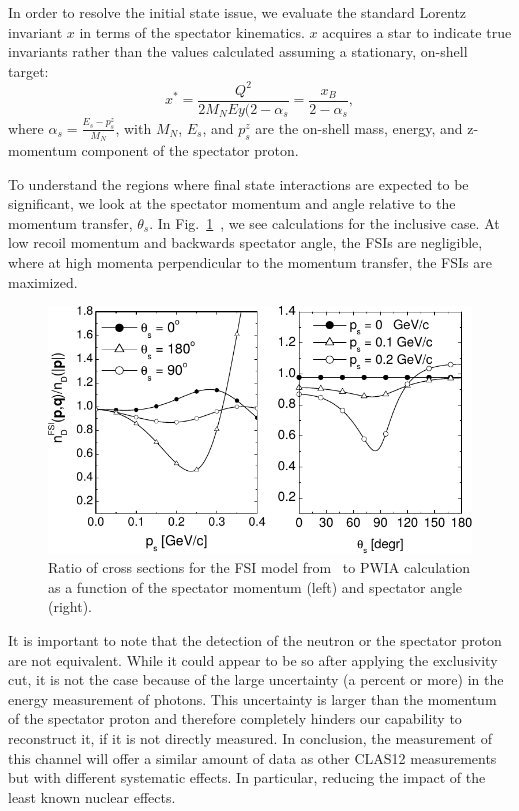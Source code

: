 In order to resolve the initial state issue, we evaluate the standard Lorentz invariant 
$x$ in terms of the spectator kinematics. $x$ acquires a star to indicate  true 
invariants rather than the values calculated assuming a stationary, on-shell 
target:
\begin{equation}
   x^* = \frac{Q^2}{2M_{N}Ey (2-\alpha_s} = \frac{x_B}{2-\alpha_s},
\end{equation} 
where $\alpha_s = \frac{E_s - p^{z}_{s}}{M_N}$, with $M_N$, $E_s$, and 
$p^{z}_{s}$ are the on-shell mass, energy, and z-momentum component of the 
spectator proton. 

To understand the regions where final state interactions are expected to be significant, we
look at the spectator momentum 
and angle relative to the momentum transfer, $\theta_s$. In 
Fig.~\ref{fig:deuteronFSI}~\cite{CiofidegliAtti:2003pb,CiofidegliAtti:2002as}, we
see calculations for the inclusive case.  
At low recoil momentum and backwards spectator angle, the FSIs are negligible, 
where at high momenta perpendicular to the momentum transfer, the FSIs are 
maximized.

\begin{figure}
   \centering
   \includegraphics{figures/FSI_quasielastic_Atti_2003.pdf}
   \caption{\label{fig:deuteronFSI} Ratio of cross sections for the FSI model 
   from~\cite{CiofidegliAtti:2003pb} to PWIA calculation as a function of
   the spectator momentum (left) and spectator angle (right).}
\end{figure}

It is important to note that the detection of the neutron or the spectator proton are not equivalent.
While it could appear to be so after applying the exclusivity cut, it is not the case because of the 
large uncertainty (a percent or more) in the energy measurement of photons. This uncertainty is larger
than the momentum of the spectator proton and therefore completely hinders our capability to reconstruct
it, if it is not directly measured.
In conclusion, the measurement of this channel will offer a similar amount of data as other 
CLAS12 measurements but with different systematic effects. In particular, reducing the impact
of the least known nuclear effects.

